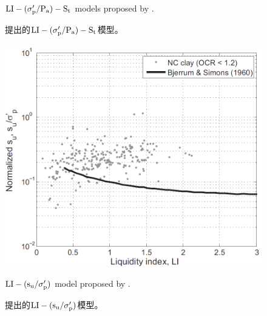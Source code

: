 \begin{figure}[!p]
\begin{minipage}[t]{0.48\textwidth}
        \caption{$\rm{LI}-(\sigma_p'/P_a)-S_t$ models proposed by \citet{Ching2012522}.}
        \vspace{-5pt}
        \addtocounter{figure}{-1}
        \renewcommand{\figurename}{图}
        \caption{\citet{Ching2012522}提出的$\rm{LI}-(\sigma_p'/P_a)-S_t$模型。}
        \label{figure:7}
        \renewcommand{\figurename}{Figure}
    \end{minipage}
\end{figure}

\begin{figure}[!p]
    \centering
    \begin{minipage}[t]{0.48\textwidth}
        \centering
        \includegraphics[width=\textwidth]{figures/figure-8.png}
        \caption{$\rm{LI}-(s_u/\sigma_p')$ model proposed by \citet{Bjerrum1960711}.}
        \vspace{-5pt}
        \addtocounter{figure}{-1}
        \renewcommand{\figurename}{图}
        \caption{\citet{Bjerrum1960711}提出的$\rm{LI}-(s_u/\sigma_p')$模型。}
        \label{figure:8}
        \renewcommand{\figurename}{Figure}
    \end{minipage}
    \begin{minipage}[t]{0.48\textwidth}
        \centering

\end{minipage}
\end{figure}
